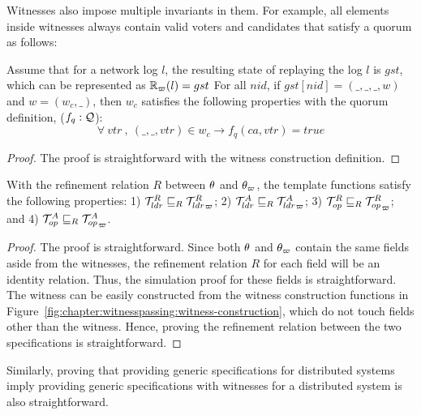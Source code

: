 Witnesses also impose multiple invariants in them.
For example, all elements inside witnesses 
always contain valid voters and candidates that satisfy a quorum as follows:


\begin{theorem}\label{thm:witness-invariant}
Assume that for a network log $l$, the resulting state of replaying the log $l$ 
	is $gst$, which can be represented as $\mathbb{R}_\varpi(l) = gst$
For all $nid$, if $gst[nid] = (\_, \_, \_, w)$ and $w = (w_c, \_)$, then $w_c$ satisfies the following properties with the quorum definition, ($f_q : \mathcal{Q}$):
$$\forall\ vtr\ , \ ( \_, \_, vtr) \in w_c \rightarrow f_q(ca, vtr) = true$$
\end{theorem}

\begin{proof}
The proof is straightforward with the witness construction definition.
\end{proof}

\begin{theorem}\label{theorem:chapter:witnesspassing:spec-refine}
With the refinement relation $R$ between $\theta$ and $\theta_\varpi$, 
the template functions satisfy the following properties:
1) $\mathcal{T}^{R}_{ldr}  \sqsubseteq_{R} {\mathcal{T}^{R}_{ldr}}_{\varpi} $; 
2) $\mathcal{T}^{A}_{ldr}  \sqsubseteq_{R} {\mathcal{T}^{A}_{ldr}}_{\varpi} $; 
3) $\mathcal{T}^{R}_{op}  \sqsubseteq_{R} {\mathcal{T}^{R}_{op}}_{\varpi} $; and
4) $\mathcal{T}^{A}_{op}  \sqsubseteq_{R} {\mathcal{T}^{A}_{op}}_{\varpi}$.
\end{theorem}

\begin{proof}
The proof is straightforward. 
Since both $\theta$ and $\theta_\varpi$ contain the same fields aside from
the witnesses, the refinement relation $R$ for each field will be an identity relation.
Thus, the simulation proof for these fields is straightforward. 
The witness can be easily constructed from the witness construction functions
in Figure~\ref{fig:chapter:witnesspassing:witness-construction}, which do not touch fields other
than the witness. 
Hence, proving the refinement relation between the two specifications is
straightforward.
\end{proof}

Similarly, proving that providing generic specifications for distributed
systems imply providing generic specifications with witnesses for a distributed system is also straightforward.


